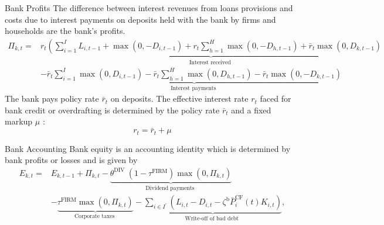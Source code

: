 \documentclass[9pt]{beamer}
\begin{document}
\begin{frame}{Bank Profits}
    The difference between interest revenues from loans provisions and costs due to interest payments on deposits held with the bank by firms and households are the bank's profits. 
\begin{equation}
    \begin{aligned}
\Pi_{k,t}= & \underbrace{r_t\left(\sum_{i=1}^I L_{i,t-1}+\max \left(0,-D_{i,t-1}\right)+r_t \sum_{h=1}^H \max \left(0,-D_{h,t-1}\right)+\bar{r}_t \max \left(0, D_{k,t-1}\right)\right.}_{\text {Interest received }} \\
& -\underbrace{\bar{r}_t \sum_{i=1}^I \max \left(0, D_{i,t-1}\right)-\bar{r}_t \sum_{h=1}^H \max \left(0, D_{h,t-1}\right)-\bar{r}_t \max \left(0,-D_{k,t-1}\right)}_{\text {Interest payments }}
\end{aligned}
\end{equation}
The bank pays policy rate $\bar{r}_t$ on deposits.   The effective interest rate $r_t$ faced for bank credit or overdrafting is determined by the policy rate $\bar{r}_t$ and a fixed markup $\mu$ :
\begin{equation}
    r_t=\bar{r}_t+\mu
\end{equation}
\hyperlink{ReturnOverview}{}

\end{frame}
\begin{frame}{Bank Accounting}
Bank equity is an accounting identity which is determined by bank profits or losses and is given by
    \begin{equation}
    \begin{aligned}
E_{k,t}= & E_{k,t-1}+\Pi_{k,t}-\underbrace{\theta^{\text {DIV }}\left(1-\tau^{\mathrm{FIRM}}\right) \max \left(0, \Pi_{k,t}\right)}_{\text {Dividend payments }} \\
& -\underbrace{\tau^{\mathrm{FIRM}} \max \left(0, \Pi_{k,t}\right)}_{\text {Corporate taxes }}-\underbrace{\sum_{i \in I^{\prime}}\left(L_{i,t}-D_{i,t}-\zeta^{\mathrm{b}} \bar{P}_i^{\mathrm{CF}}(t) K_{i,t}\right)}_{\text {Write-off of bad debt }},
\end{aligned}
\end{equation}
      \hyperlink{ReturnOverview}{}

\end{frame}
\end{document}
